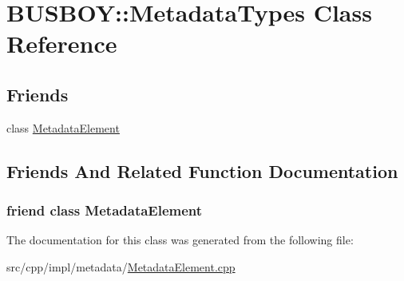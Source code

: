 \hypertarget{classBUSBOY_1_1MetadataTypes}{
\section{BUSBOY::MetadataTypes Class Reference}
\label{classBUSBOY_1_1MetadataTypes}
}
\subsection*{Friends}
\begin{DoxyCompactItemize}
\item 
class \hyperlink{classBUSBOY_1_1MetadataTypes_a98d73a911b29100d094e915f1a3bd8c7}{MetadataElement}
\end{DoxyCompactItemize}


\subsection{Friends And Related Function Documentation}
\hypertarget{classBUSBOY_1_1MetadataTypes_a98d73a911b29100d094e915f1a3bd8c7}{
\subsubsection[{MetadataElement}]{\setlength{\rightskip}{0pt plus 5cm}friend class {\bf MetadataElement}}}
\label{classBUSBOY_1_1MetadataTypes_a98d73a911b29100d094e915f1a3bd8c7}


The documentation for this class was generated from the following file:\begin{DoxyCompactItemize}
\item 
src/cpp/impl/metadata/\hyperlink{MetadataElement_8cpp}{MetadataElement.cpp}\end{DoxyCompactItemize}
